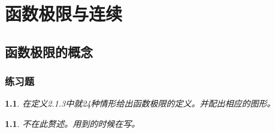 \documentclass[utf8]{book}
\newtheorem{example}{}[section]             %
\newtheorem{solution}{}
\begin{document}
\chapter{函数极限与连续}
\section{函数极限的概念}
\subsection{练习题}
\begin{example}
在定义2.1.3中就24种情形给出函数极限的定义。并配出相应的图形。
\end{example}
\begin{solution}
不在此赘述。用到的时候在写。
\end{solution}
\end{document}
